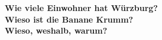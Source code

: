 
\textbf{Wie viele Einwohner hat Würzburg?}\\
\textbf{Wieso ist die Banane Krumm?}\\
\textbf{Wieso, weshalb, warum?}\\
